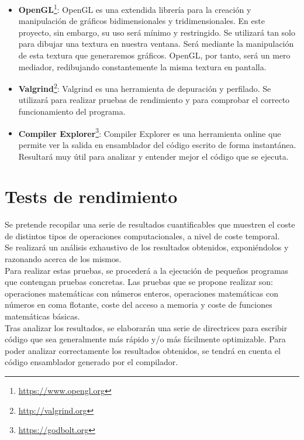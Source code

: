 \begin{itemize}
	\item \textbf{OpenGL}\footnote{\url{https://www.opengl.org}}: OpenGL es una extendida librería para la creación y manipulación de gráficos bidimensionales y tridimensionales. En este proyecto, sin embargo, su uso será mínimo y restringido. Se utilizará tan solo para dibujar una textura en nuestra ventana. Será mediante la manipulación de esta textura que generaremos gráficos. OpenGL, por tanto, será un mero mediador, redibujando constantemente la misma textura en pantalla.
	\item \textbf{Valgrind}\footnote{\url{http://valgrind.org}}: Valgrind es una herramienta de depuración y perfilado. Se utilizará para realizar pruebas de rendimiento y para comprobar el correcto funcionamiento del programa. 
	\item \textbf{Compiler Explorer}\footnote{\url{https://godbolt.org}}: Compiler Explorer es una herramienta online que permite ver la salida en ensamblador del código escrito de forma instantánea. Resultará muy útil para analizar y entender mejor el código que se ejecuta.
\end{itemize}

\section{Tests de rendimiento}

Se pretende recopilar una serie de resultados cuantificables que muestren el coste de distintos tipos de operaciones computacionales, a nivel de coste temporal.\\

Se realizará un análisis exhaustivo de los resultados obtenidos, exponiéndolos y razonando acerca de los mismos.\\

Para realizar estas pruebas, se procederá a la ejecución de pequeños programas que contengan pruebas concretas. Las pruebas que se propone realizar son: operaciones matemáticas con números enteros, operaciones matemáticas con números en coma flotante, coste del acceso a memoria y coste de funciones matemáticas básicas.\\

Tras analizar los resultados, se elaborarán una serie de directrices para escribir código que sea generalmente más rápido y/o más fácilmente optimizable. Para poder analizar correctamente los resultados obtenidos, se tendrá en cuenta el código ensamblador generado por el compilador.\\

